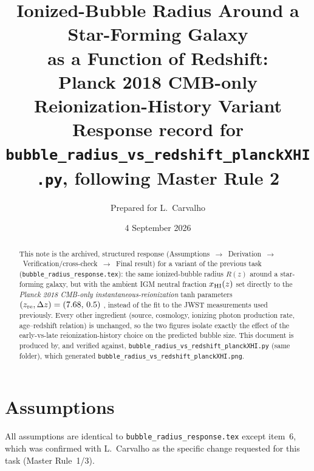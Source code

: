 \documentclass[11pt,a4paper]{article}
\title{\bf Ionized-Bubble Radius Around a Star-Forming Galaxy\\ as a Function of Redshift:\\
Planck 2018 CMB-only Reionization-History Variant\\[2mm]
\large Response record for \texttt{bubble\_radius\_vs\_redshift\_planckXHI.py}, following Master Rule 2}
\author{Prepared for L.\ Carvalho}
\date{4 September 2026}
\begin{document}
\maketitle

\begin{abstract}
\noindent
This note is the archived, structured response (Assumptions~$\to$~Derivation~$\to$~Verification/cross-check~$\to$~Final
result) for a variant of the previous task (\texttt{bubble\_radius\_response.tex}): the same ionized-bubble
radius $R(z)$ around a star-forming galaxy, but with the ambient IGM neutral fraction $x_{\rm HI}(z)$ set
directly to the \emph{Planck 2018 CMB-only instantaneous-reionization} tanh parameters
$(z_{\rm re},\Delta z)=(7.68,\,0.5)$ \citep{Planck2018VI}, instead of the fit to the \citet{Umeda2023}
JWST measurements used previously. Every other ingredient (source, cosmology, ionizing photon production
rate, age--redshift relation) is unchanged, so the two figures isolate exactly the effect of the
early-vs-late reionization-history choice on the predicted bubble size. This document is produced by, and
verified against, \texttt{bubble\_radius\_vs\_redshift\_planckXHI.py} (same folder), which generated
\texttt{bubble\_radius\_vs\_redshift\_planckXHI.png}.
\end{abstract}

\tableofcontents

\section{Assumptions}
\label{sec:assumptions}

All assumptions are identical to \texttt{bubble\_radius\_response.tex} except item~6, which was confirmed
with L.\ Carvalho as the specific change requested for this task (Master Rule~1/3).
\end{document}

